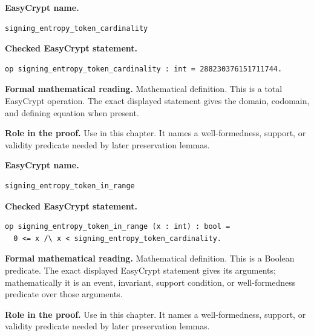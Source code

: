 \begin{formaldefinition}
\noindent\textbf{EasyCrypt name.}
\begin{lstlisting}[language=EasyCrypt,basicstyle=\ttfamily\scriptsize]
signing_entropy_token_cardinality
\end{lstlisting}
\noindent\textbf{Checked EasyCrypt statement.}
\begin{lstlisting}[language=EasyCrypt,basicstyle=\ttfamily\scriptsize]
op signing_entropy_token_cardinality : int = 288230376151711744.
\end{lstlisting}
\noindent\textbf{Formal mathematical reading.}
Mathematical definition. This is a total EasyCrypt operation.  The exact displayed statement gives the domain, codomain, and defining equation when present.

\noindent\textbf{Role in the proof.}
Use in this chapter. It names a well-formedness, support, or validity predicate needed by later preservation lemmas.

\end{formaldefinition}

\begin{formaldefinition}
\noindent\textbf{EasyCrypt name.}
\begin{lstlisting}[language=EasyCrypt,basicstyle=\ttfamily\scriptsize]
signing_entropy_token_in_range
\end{lstlisting}
\noindent\textbf{Checked EasyCrypt statement.}
\begin{lstlisting}[language=EasyCrypt,basicstyle=\ttfamily\scriptsize]
op signing_entropy_token_in_range (x : int) : bool =
  0 <= x /\ x < signing_entropy_token_cardinality.
\end{lstlisting}
\noindent\textbf{Formal mathematical reading.}
Mathematical definition. This is a Boolean predicate.  The exact displayed EasyCrypt statement gives its arguments; mathematically it is an event, invariant, support condition, or well-formedness predicate over those arguments.

\noindent\textbf{Role in the proof.}
Use in this chapter. It names a well-formedness, support, or validity predicate needed by later preservation lemmas.

\end{formaldefinition}

